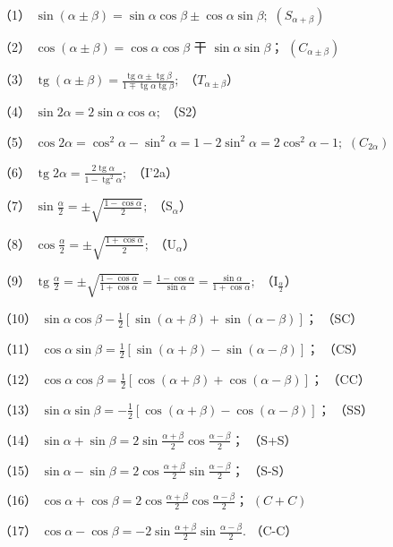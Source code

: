 （1）
\(\sin (\alpha \pm \beta) = \sin \alpha \cos \beta \pm \cos \alpha \sin \beta;\)
\((S_{\alpha + \beta})\)

（2） \(\cos (\alpha \pm \beta) = \cos \alpha \cos \beta\) 干
\(\sin \alpha \sin \beta\)； \((C_{\alpha \pm \beta})\)

（3）
\(\operatorname{tg}(\alpha \pm \beta) = \frac{\operatorname{tg}\alpha \pm \operatorname{tg}\beta}{1 \mp \operatorname{tg}\alpha \operatorname{tg}\beta};\)
（\(T_{\alpha \pm \beta}\)）

（4） \(\sin 2\alpha = 2\sin \alpha \cos \alpha ;\) （S2）

（5）
\(\cos 2\alpha = \cos^2\alpha -\sin^2\alpha = 1 - 2\sin^2\alpha = 2\cos^2\alpha -1;\)
\((C_{2\alpha})\)

（6）
\(\operatorname{tg} 2\alpha = \frac{2\operatorname{tg}\alpha}{1 - \operatorname{tg}^2\alpha};\)
（I'2a）

（7） \(\sin \frac{\alpha}{2} = \pm \sqrt{\frac{1 - \cos\alpha}{2}};\)
（S\(_{\alpha}\)）

（8） \(\cos \frac{\alpha}{2} = \pm \sqrt{\frac{1 + \cos\alpha}{2}};\)
（U\(_{\alpha}\)）

（9）
\(\operatorname{tg} \frac{\alpha}{2} = \pm \sqrt{\frac{1 - \cos \alpha}{1 + \cos \alpha}} = \frac{1 - \cos \alpha}{\sin \alpha} = \frac{\sin \alpha}{1 + \cos \alpha};\)
（I\(_{\frac{\alpha}{2}}\)）

（10）
\(\sin \alpha \cos \beta - \frac{1}{2} [\sin (\alpha + \beta) + \sin (\alpha - \beta)]\)；
（SC）

（11）
\(\cos \alpha \sin \beta = \frac{1}{2} [\sin (\alpha + \beta) - \sin (\alpha - \beta)]\)；
（CS）

（12）
\(\cos \alpha \cos \beta = \frac{1}{2} [\cos (\alpha + \beta) + \cos (\alpha - \beta)]\)；
（CC）

（13）
\(\sin \alpha \sin \beta = -\frac{1}{2} [\cos (\alpha + \beta) - \cos (\alpha - \beta)]\)；
（SS）

（14）
\(\sin \alpha + \sin \beta = 2\sin \frac{\alpha + \beta}{2}\cos \frac{\alpha - \beta}{2}\)；
（S+S）

（15）
\(\sin \alpha - \sin \beta = 2\cos \frac{\alpha + \beta}{2}\sin \frac{\alpha - \beta}{2}\)；
（S-S）

（16）
\(\cos \alpha + \cos \beta = 2\cos \frac{\alpha + \beta}{2}\cos \frac{\alpha - \beta}{2}\)；
\((C + C)\)

（17）
\(\cos \alpha - \cos \beta = -2\sin \frac{\alpha + \beta}{2}\sin \frac{\alpha - \beta}{2}\).
（C-C）

